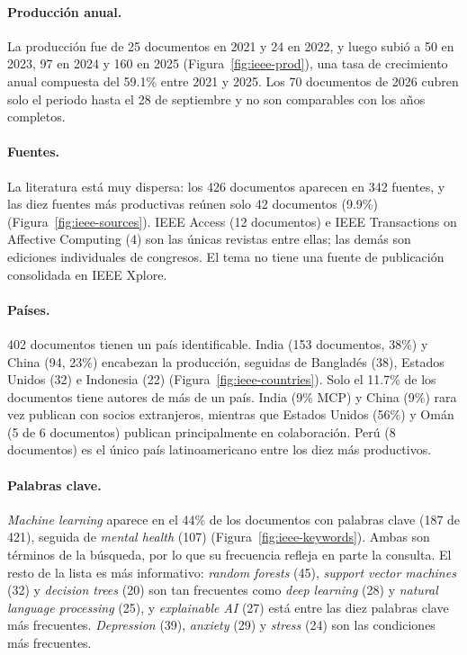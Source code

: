 \documentclass[11pt,a4paper]{article}
\begin{document}
\paragraph{Producción anual.} La producción fue de 25 documentos en 2021 y 24 en 2022, y luego subió a 50 en 2023, 97 en 2024 y 160 en 2025 (Figura~\ref{fig:ieee-prod}), una tasa de crecimiento anual compuesta del 59.1\% entre 2021 y 2025. Los 70 documentos de 2026 cubren solo el periodo hasta el 28 de septiembre y no son comparables con los años completos.

\paragraph{Fuentes.} La literatura está muy dispersa: los 426 documentos aparecen en 342 fuentes, y las diez fuentes más productivas reúnen solo 42 documentos (9.9\%) (Figura~\ref{fig:ieee-sources}). IEEE Access (12 documentos) e IEEE Transactions on Affective Computing (4) son las únicas revistas entre ellas; las demás son ediciones individuales de congresos. El tema no tiene una fuente de publicación consolidada en IEEE Xplore.

\paragraph{Países.} 402 documentos tienen un país identificable. India (153 documentos, 38\%) y China (94, 23\%) encabezan la producción, seguidas de Bangladés (38), Estados Unidos (32) e Indonesia (22) (Figura~\ref{fig:ieee-countries}). Solo el 11.7\% de los documentos tiene autores de más de un país. India (9\% MCP) y China (9\%) rara vez publican con socios extranjeros, mientras que Estados Unidos (56\%) y Omán (5 de 6 documentos) publican principalmente en colaboración. Perú (8 documentos) es el único país latinoamericano entre los diez más productivos.

\paragraph{Palabras clave.} \emph{Machine learning} aparece en el 44\% de los documentos con palabras clave (187 de 421), seguida de \emph{mental health} (107) (Figura~\ref{fig:ieee-keywords}). Ambas son términos de la búsqueda, por lo que su frecuencia refleja en parte la consulta. El resto de la lista es más informativo: \emph{random forests} (45), \emph{support vector machines} (32) y \emph{decision trees} (20) son tan frecuentes como \emph{deep learning} (28) y \emph{natural language processing} (25), y \emph{explainable AI} (27) está entre las diez palabras clave más frecuentes. \emph{Depression} (39), \emph{anxiety} (29) y \emph{stress} (24) son las condiciones más frecuentes.
\end{document}

